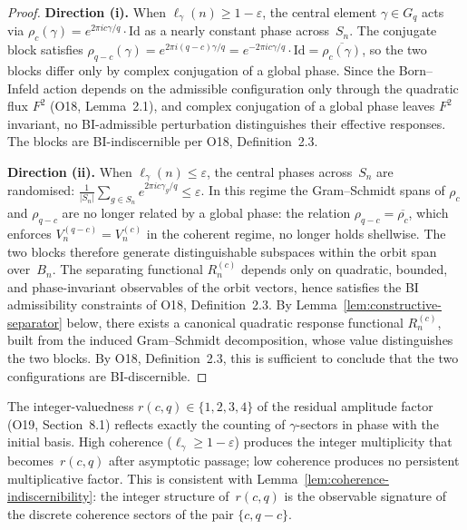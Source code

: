     \begin{proof}
      \textbf{Direction (i).}
      When $\ell_\gamma(n) \geq 1 - \varepsilon$, the central element $\gamma \in G_q$ acts
      via $\rho_c(\gamma) = e^{2\pi i c \gamma / q} \cdot \mathrm{Id}$ as a nearly
      constant phase across~$S_n$.
      The conjugate block satisfies
      $\rho_{q-c}(\gamma) = e^{2\pi i (q-c) \gamma / q} = e^{-2\pi i c \gamma / q}
      \cdot \mathrm{Id} = \overline{\rho_c(\gamma)}$,
      so the two blocks differ only by complex conjugation of a global phase.
      Since the Born--Infeld action depends on the admissible configuration
      only through the quadratic flux $F^2$ (O18, Lemma~2.1), and complex
      conjugation of a global phase leaves $F^2$ invariant, no BI-admissible
      perturbation distinguishes their effective responses.
      The blocks are BI-indiscernible per O18, Definition~2.3.

      \textbf{Direction (ii).}
      When $\ell_\gamma(n) \leq \varepsilon$, the central phases across~$S_n$ are
      randomised: $\frac{1}{|S_n|}\sum_{g \in S_n} e^{2\pi i c \gamma_g / q} \leq \varepsilon$.
      In this regime the Gram--Schmidt spans of $\rho_c$ and $\rho_{q-c}$ are
      no longer related by a global phase: the relation
      $\rho_{q-c} = \overline{\rho_c}$, which enforces $V_n^{(q-c)} = V_n^{(c)}$
      in the coherent regime, no longer holds shellwise.
      The two blocks therefore generate distinguishable
      subspaces within the orbit span over~$B_n$.
      The separating functional $R_n^{(c)}$ depends only on quadratic, bounded,
      and phase-invariant observables of the orbit vectors,
      hence satisfies the BI admissibility constraints of O18, Definition~2.3.
      By Lemma~\ref{lem:constructive-separator} below, there exists a canonical
      quadratic response functional $R_n^{(c)}$, built from the induced
      Gram--Schmidt decomposition, whose value distinguishes the two blocks.
      By O18, Definition~2.3, this is sufficient to conclude that the two
      configurations are BI-discernible.
    \end{proof}

    \begin{remark}
      The integer-valuedness $r(c,q) \in \{1,2,3,4\}$ of the residual amplitude
      factor (O19, Section~8.1) reflects exactly the counting of
      $\gamma$-sectors in phase with the initial basis.
      High coherence ($\ell_\gamma \geq 1 - \varepsilon$) produces the integer multiplicity
      that becomes~$r(c,q)$ after asymptotic passage;
      low coherence produces no persistent multiplicative factor.
      This is consistent with Lemma~\ref{lem:coherence-indiscernibility}:
      the integer structure of~$r(c,q)$ is the observable signature of the
      discrete coherence sectors of the pair $\{c, q-c\}$.
    \end{remark}

